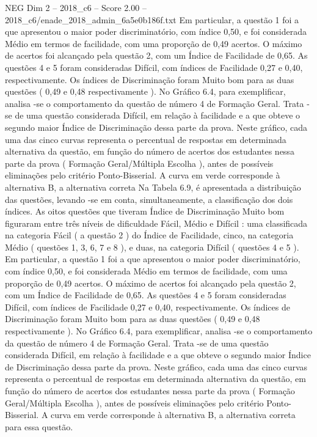 \begin{textsample}{NEG Dim 2 – 2018\_c6 – Score 2.00 – 2018\_c6/enade\_2018\_admin\_6a5e0b186f.txt}
Em particular, a questão 1 foi a que apresentou o maior poder discriminatório, com índice 0,50, e foi considerada Médio em termos de facilidade, com uma proporção de 0,49 acertos.
O máximo de acertos foi alcançado pela questão 2, com um Índice de Facilidade de 0,65.
As questões 4 e 5 foram consideradas Difícil, com índices de Facilidade 0,27 e 0,40, respectivamente.
Os índices de Discriminação foram Muito bom para as duas questões ( 0,49 e 0,48 respectivamente ).
No Gráfico 6.4, para exemplificar, analisa -se o comportamento da questão de número 4 de Formação Geral.
Trata -se de uma questão considerada Difícil, em relação à facilidade e a que obteve o segundo maior Índice de Discriminação dessa parte da prova.
Neste gráfico, cada uma das cinco curvas representa o percentual de respostas em determinada alternativa da questão, em função do número de acertos dos estudantes nessa parte da prova ( Formação Geral/Múltipla Escolha ), antes de possíveis eliminações pelo critério Ponto-Bisserial.
A curva em verde corresponde à alternativa B, a alternativa correta Na Tabela 6.9, é apresentada a distribuição das questões, levando -se em conta, simultaneamente, a classificação dos dois índices.
As oitos questões que tiveram Índice de Discriminação Muito bom figuraram entre três níveis de dificuldade Fácil, Médio e Difícil : uma classificada na categoria Fácil ( a questão 2 ) do Índice de Facilidade, cinco, na categoria Médio ( questões 1, 3, 6, 7 e 8 ), e duas, na categoria Difícil ( questões 4 e 5 ).
Em particular, a questão 1 foi a que apresentou o maior poder discriminatório, com índice 0,50, e foi considerada Médio em termos de facilidade, com uma proporção de 0,49 acertos.
O máximo de acertos foi alcançado pela questão 2, com um Índice de Facilidade de 0,65.
As questões 4 e 5 foram consideradas Difícil, com índices de Facilidade 0,27 e 0,40, respectivamente.
Os índices de Discriminação foram Muito bom para as duas questões ( 0,49 e 0,48 respectivamente ).
No Gráfico 6.4, para exemplificar, analisa -se o comportamento da questão de número 4 de Formação Geral.
Trata -se de uma questão considerada Difícil, em relação à facilidade e a que obteve o segundo maior Índice de Discriminação dessa parte da prova.
Neste gráfico, cada uma das cinco curvas representa o percentual de respostas em determinada alternativa da questão, em função do número de acertos dos estudantes nessa parte da prova ( Formação Geral/Múltipla Escolha ), antes de possíveis eliminações pelo critério Ponto-Bisserial.
A curva em verde corresponde à alternativa B, a alternativa correta para essa questão.

\end{textsample}
